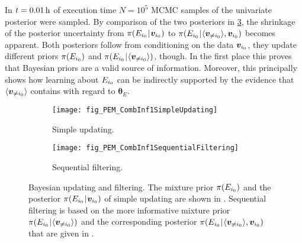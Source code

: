 In \(t = \unit[0.01]{h}\) of execution time \(N=10^5\) MCMC samples of the univariate posterior were sampled.
By comparison of the two posteriors in \cref{fig:PEM:CombInf:UpdatingAndFiltering}, the shrinkage of the posterior uncertainty from
\(\pi(E_{i_0} {\:\!}|{\:\!} \bm{v}_{i_0})\) to \(\pi(E_{i_0} {\:\!}|{\:\!} \langle{\bm{v}_{\neq i_0}}\rangle,\bm{v}_{i_0})\) becomes apparent.
Both posteriors follow from conditioning on the data \(\bm{v}_{i_0}\), they update different priors \(\pi(E_{i_0})\) and \(\pi(E_{i_0} {\:\!}|{\:\!} \langle{\bm{v}_{\neq i_0}}\rangle)\), though.
In the first place this proves that Bayesian priors are a valid source of information.
Moreover, this principally shows how learning about \(E_{i_0}\) can be indirectly supported by the evidence that \(\langle{\bm{v}_{\neq i_0}}\rangle\) contains with regard to \(\bm{\theta}_E\).
\begin{figure}[ht]
  \centering
  \begin{subfigure}[b]{0.5\textwidth}
    \centering
    \texttt{[image: fig\_PEM\_CombInf1SimpleUpdating]}
    \caption{Simple updating.}
    \label{fig:PEM:CombInf:SimpleUpdating}
  \end{subfigure}%
  \begin{subfigure}[b]{0.5\textwidth}
    \centering
    \texttt{[image: fig\_PEM\_CombInf1SequentialFiltering]}
    \caption{Sequential filtering.}
    \label{fig:PEM:CombInf:SequentialFiltering}
  \end{subfigure}%
  \caption[Bayesian updating and filtering]{Bayesian updating and filtering.
           The mixture prior \(\pi(E_{i_0})\) and the posterior \(\pi(E_{i_0} {\:\!}|{\:\!} \bm{v}_{i_0})\) of simple updating are shown in .
           Sequential filtering is based on the more informative mixture prior \(\pi(E_{i_0} {\:\!}|{\:\!} \langle{\bm{v}_{\neq i_0}}\rangle)\) and the corresponding posterior
           \(\pi(E_{i_0} {\:\!}|{\:\!} \langle{\bm{v}_{\neq i_0}}\rangle,\bm{v}_{i_0})\) that are given in .
          }
  \label{fig:PEM:CombInf:UpdatingAndFiltering}
\end{figure}
\par %
